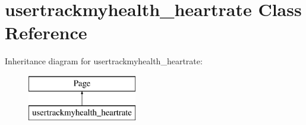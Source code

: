 \hypertarget{classusertrackmyhealth__heartrate}{\section{usertrackmyhealth\-\_\-heartrate Class Reference}
\label{classusertrackmyhealth__heartrate}
}
Inheritance diagram for usertrackmyhealth\-\_\-heartrate\-:\begin{figure}[H]
\begin{center}
\leavevmode
\includegraphics[height=2.000000cm]{classusertrackmyhealth__heartrate}
\end{center}
\end{figure}
